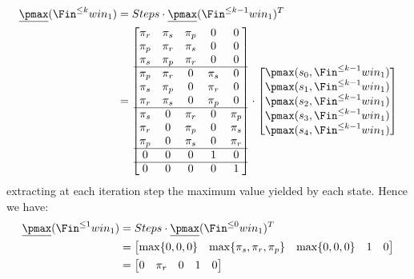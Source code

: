 \begin{align*}
	\underline{\pmax}(\Fin^{\le k} win_1) & = Steps \cdot \underline{\pmax}(\Fin^{\le k-1} win_1)^T \\
	                                      & = \begin{bmatrix}
		                                          \pi_r & \pi_s & \pi_p & 0     & 0     \\
		                                          \pi_p & \pi_r & \pi_s & 0     & 0     \\
		                                          \pi_s & \pi_p & \pi_r & 0     & 0     \\
		                                          \hline
		                                          \pi_p & \pi_r & 0     & \pi_s & 0     \\
		                                          \pi_s & \pi_p & 0     & \pi_r & 0     \\
		                                          \pi_r & \pi_s & 0     & \pi_p & 0     \\
		                                          \hline
		                                          \pi_s & 0     & \pi_r & 0     & \pi_p \\
		                                          \pi_r & 0     & \pi_p & 0     & \pi_s \\
		                                          \pi_p & 0     & \pi_s & 0     & \pi_r \\
		                                          \hline
		                                          0     & 0     & 0     & 1     & 0     \\
		                                          \hline
		                                          0     & 0     & 0     & 0     & 1
	                                          \end{bmatrix} \cdot
	\begin{bmatrix}
		\pmax(s_0, \Fin^{\le k-1} win_1) \\
		\pmax(s_1, \Fin^{\le k-1} win_1) \\
		\pmax(s_2, \Fin^{\le k-1} win_1) \\
		\pmax(s_3, \Fin^{\le k-1} win_1) \\
		\pmax(s_4, \Fin^{\le k-1} win_1)
	\end{bmatrix}
\end{align*}
extracting at each iteration step the maximum value yielded by each state.
Hence we have:
\begin{align*}
	\underline{\pmax}(\Fin^{\le 1} win_1) & = Steps \cdot \underline{\pmax}(\Fin^{\le 0} win_1)^T                              \\
	                                      & = \begin{bmatrix}
		                                          \max \{ 0, 0, 0 \} & \max \{ \pi_s, \pi_r, \pi_p \} & \max \{ 0, 0, 0 \} & 1 & 0
	                                          \end{bmatrix} \\
	                                      & = \begin{bmatrix} 0 & \pi_r & 0 & 1 & 0 \end{bmatrix}
\end{align*}
